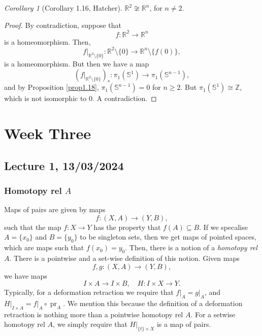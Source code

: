 \documentclass[a4paper]{report}
\theoremstyle{definition}
\theoremstyle{remark}
\theoremstyle{proposition}
\theoremstyle{conjecture}
\theoremstyle{lemma}
\theoremstyle{corollary}
\newtheorem{corollary}{Corollary}
\theoremstyle{exercise}
\newcommand{\on}{\operatorname}
\begin{document}
\begin{corollary}[Corollary 1.16, Hatcher]
    $\mathbb{R}^2 \not\cong \mathbb{R}^n$, for $n \neq 2$.
\end{corollary}

\begin{proof}
    By contradiction, suppose that 
    $$f : \mathbb{R}^2 \longrightarrow \mathbb{R}^n$$
    is a homeomorphism. Then, 
    $$f\vert_{\mathbb{R}^2\setminus \lbrace 0\rbrace} :\mathbb{R}^2 \setminus \lbrace 0 \rbrace \longrightarrow \mathbb{R}^n\setminus \lbrace f(0)\rbrace,$$
    is a homeomorphism.
    But then we have a map 
    $$(f\vert_{\mathbb{R}^2\setminus\lbrace0\rbrace})_\ast : \pi_1(\mathbb{S}^1) \longrightarrow \pi_1(\mathbb{S}^{n-1}),$$
    and by Proposition \ref{prop1.18}, $\pi_1(\mathbb{S}^{n-1}) = 0$
    for $n \geq 2$. But $\pi_1(\mathbb{S}^1)\cong \mathbb{Z}$, which is 
    not isomorphic to $0$. A contradiction.
\end{proof}

\chapter{Week Three}

\section{Lecture 1, 13/03/2024}

\subsection{Homotopy rel $A$}

Maps of pairs are given by maps
$$f : (X,A) \longrightarrow (Y,B),$$
such that the map $f : X \to Y$ has the property that 
$f(A) \subseteq B$. If we specalise $A = \lbrace x_0 \rbrace$ and 
$B = \lbrace y_0\rbrace$ to be singleton sets, then we get maps 
of pointed spaces, which are maps such that $f(x_0) = y_0$.
Then, there is a notion of a \emph{homotopy rel $A$}. There is a pointwise
and a set-wise definition of this notion.
Given maps $$f,g : (X,A) \longrightarrow (Y,B),$$
we have maps $$I \times A \longrightarrow I \times B, \quad H : I\times X \longrightarrow Y.$$
Typically, for a deformation retraction we require that $f\vert_A = g\vert_A$,
and $H\vert_{I\times A} = f\vert_A \circ \on{pr}_A$.
We mention this because the definition of a deformation retraction is nothing 
more than a pointwise homotopy rel $A$. For a setwise homotopy rel $A$, we 
simply require that $H\vert_{\lbrace t\rbrace \times X}$ is a map of 
pairs.
\end{document}
